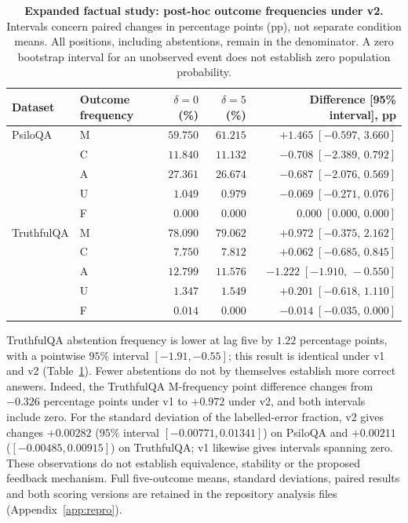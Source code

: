 \documentclass[11pt]{article}
\theoremstyle{definition}
\begin{document}
\begin{table}[t]
\centering
\small
\begin{tabular}{llrrr}
\hline
Dataset & Outcome frequency & $\delta=0$ (\%) & $\delta=5$ (\%) & Difference [95\% interval], pp\\
\hline
PsiloQA & M & $59.750$ & $61.215$ & $+1.465\;[-0.597,\,3.660]$\\
 & C & $11.840$ & $11.132$ & $-0.708\;[-2.389,\,0.792]$\\
 & A & $27.361$ & $26.674$ & $-0.687\;[-2.076,\,0.569]$\\
 & U & $1.049$ & $0.979$ & $-0.069\;[-0.271,\,0.076]$\\
 & F & $0.000$ & $0.000$ & $0.000\;[0.000,\,0.000]$\\
TruthfulQA & M & $78.090$ & $79.062$ & $+0.972\;[-0.375,\,2.162]$\\
 & C & $7.750$ & $7.812$ & $+0.062\;[-0.685,\,0.845]$\\
 & A & $12.799$ & $11.576$ & $-1.222\;[-1.910,\,-0.550]$\\
 & U & $1.347$ & $1.549$ & $+0.201\;[-0.618,\,1.110]$\\
 & F & $0.014$ & $0.000$ & $-0.014\;[-0.035,\,0.000]$\\
\hline
\end{tabular}
\caption{\textbf{Expanded factual study: post-hoc outcome frequencies under v2.}
Intervals concern paired changes in percentage points (pp), not separate condition means.
All positions, including abstentions, remain in the denominator. A zero bootstrap interval for
an unobserved event does not establish zero population probability.}
\label{tab:expanded-outcomes}
\end{table}

TruthfulQA abstention frequency is lower at lag five by $1.22$ percentage points, with a pointwise
$95\%$ interval $[-1.91,-0.55]$; this result is identical under v1 and v2
(Table~\ref{tab:expanded-outcomes}). Fewer abstentions do not by themselves establish more correct
answers. Indeed, the TruthfulQA M-frequency point difference changes from $-0.326$ percentage points
under v1 to $+0.972$ under v2, and both intervals include zero. For the standard deviation of
the labelled-error fraction, v2 gives changes $+0.00282$ ($95\%$ interval
$[-0.00771,0.01341]$) on PsiloQA and $+0.00211$ ($[-0.00485,0.00915]$) on TruthfulQA;
v1 likewise gives intervals spanning zero. These observations do not establish equivalence,
stability or the proposed feedback mechanism. Full five-outcome means, standard deviations,
paired results and both scoring versions are retained in the repository analysis files
(Appendix~\ref{app:repro}).
\end{document}
